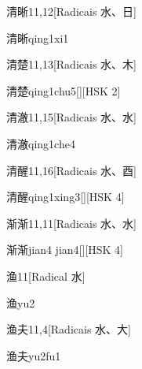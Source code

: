 \begin{entry}{清晰}{11,12}[Radicais ⽔、⽇]
  \begin{phonetics}{清晰}{qing1xi1}
  \end{phonetics}
\end{entry}

\begin{entry}{清楚}{11,13}[Radicais ⽔、⽊]
  \begin{phonetics}{清楚}{qing1chu5}[][HSK 2]
  \end{phonetics}
\end{entry}

\begin{entry}{清澈}{11,15}[Radicais ⽔、⽔]
  \begin{phonetics}{清澈}{qing1che4}
  \end{phonetics}
\end{entry}

\begin{entry}{清醒}{11,16}[Radicais ⽔、⾣]
  \begin{phonetics}{清醒}{qing1xing3}[][HSK 4]
  \end{phonetics}
\end{entry}

\begin{entry}{渐渐}{11,11}[Radicais ⽔、⽔]
  \begin{phonetics}{渐渐}{jian4 jian4}[][HSK 4]
  \end{phonetics}
\end{entry}

\begin{entry}{渔}{11}[Radical ⽔]
  \begin{phonetics}{渔}{yu2}
  \end{phonetics}
\end{entry}

\begin{entry}{渔夫}{11,4}[Radicais ⽔、⼤]
  \begin{phonetics}{渔夫}{yu2fu1}
  \end{phonetics}
\end{entry}

